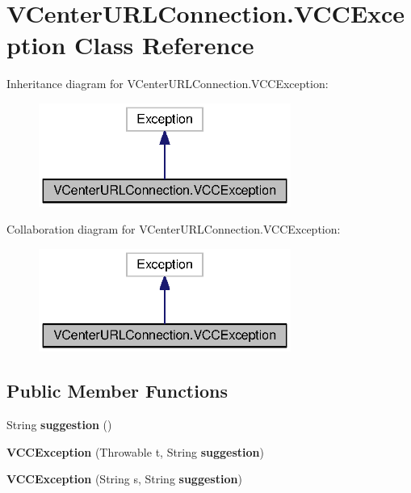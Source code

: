 \section{V\+Center\+U\+R\+L\+Connection.\+V\+C\+C\+Exception Class Reference}
\label{classorg_1_1smallfoot_1_1parser_1_1vmware_1_1VCenterURLConnection_1_1VCCException}


Inheritance diagram for V\+Center\+U\+R\+L\+Connection.\+V\+C\+C\+Exception\+:\nopagebreak
\begin{figure}[H]
\begin{center}
\leavevmode
\includegraphics[width=234pt]{classorg_1_1smallfoot_1_1parser_1_1vmware_1_1VCenterURLConnection_1_1VCCException__inherit__graph}
\end{center}
\end{figure}


Collaboration diagram for V\+Center\+U\+R\+L\+Connection.\+V\+C\+C\+Exception\+:\nopagebreak
\begin{figure}[H]
\begin{center}
\leavevmode
\includegraphics[width=234pt]{classorg_1_1smallfoot_1_1parser_1_1vmware_1_1VCenterURLConnection_1_1VCCException__coll__graph}
\end{center}
\end{figure}
\subsection*{Public Member Functions}
\begin{DoxyCompactItemize}
\item 
String {\bf suggestion} ()
\item 
{\bf V\+C\+C\+Exception} (Throwable t, String {\bf suggestion})
\item 
{\bf V\+C\+C\+Exception} (String s, String {\bf suggestion})
\end{DoxyCompactItemize}
